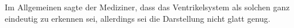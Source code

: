  Im Allgemeinen sagte der Mediziner, dass das Ventrikelsystem als solchen ganz eindeutig zu erkennen sei, allerdings sei die Darstellung nicht glatt genug.
























































